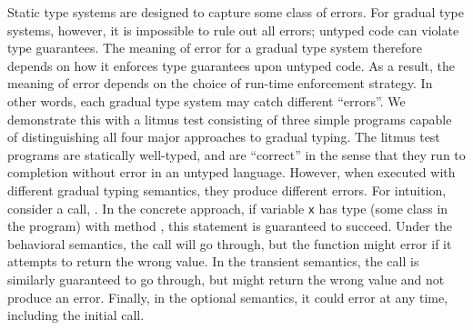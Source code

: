 \documentclass[USenglish]{tex/lipics-v2016}
\newcommand{\code}[1]{{\tt #1}\xspace}
\begin{document}
Static type systems are designed to capture some class of errors. For
gradual type systems, however, it is impossible to rule out all errors;
untyped code can violate type guarantees. The meaning of error for a gradual
type system therefore depends on how it enforces type guarantees upon untyped
code. As a result, the meaning of error depends on the choice of run-time
enforcement strategy. In other words, each gradual type system may catch
different ``errors''.  We demonstrate this with a litmus test consisting of
three simple programs capable of distinguishing all four major approaches to
gradual typing. The litmus test programs are statically well-typed, and are
``correct'' in the sense that they run to completion without error in an
untyped language. However, when executed with different gradual typing
semantics, they produce different errors. For intuition,
consider a call, . In the concrete approach, if variable \code x
has type \C (some class in the program) with method \m, this statement is guaranteed to
succeed. Under the behavioral semantics, the call will go through, but the function
might error if it attempts to return the wrong value. In the transient semantics, the call is similarly
guaranteed to go through, but might return the wrong value and not produce an error.
Finally, in the optional semantics, it could error at any time, including the initial
call.

\begin{figure}\begin{center}
\vspace{-6mm}
\end{center}
\vspace{-7mm}\end{figure}
\end{document}
